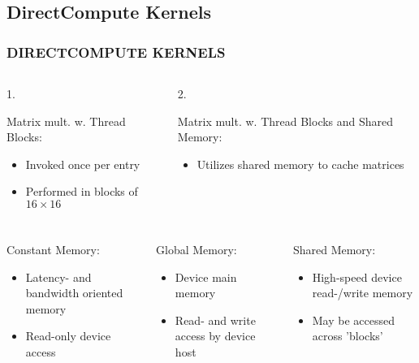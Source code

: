 \subsection{DirectCompute Kernels}
\begin{frame}[t]
\frametitle{DIRECTCOMPUTE KERNELS}

\begin{columns}[T]
  \begin{column}[T]{0.5\textwidth}
    \begin{center}1.\end{center}
    Matrix mult. w. Thread Blocks:
    \begin{itemize}
    \item Invoked once per entry
    \item Performed in blocks of $16\times 16$
    \end{itemize}
  \end{column}
  \begin{column}[T]{0.5\textwidth}
    \begin{center}2.\end{center}
    Matrix mult. w. Thread Blocks and Shared Memory:
    \begin{itemize}
    \item Utilizes shared memory to cache matrices
    \end{itemize}
  \end{column}
\end{columns}

{\footnotesize\it%
  \begin{block}{}
    \begin{columns}[T]
      \begin{column}[T]{0.33\textwidth}
        Constant Memory:
        \begin{itemize}
        \item Latency- and bandwidth oriented memory
        \item Read-only device access
        \end{itemize}
      \end{column}
      \begin{column}[T]{0.33\textwidth}
        Global Memory:
        \begin{itemize}
        \item Device main memory
        \item Read- and write access by device host
        \end{itemize}
      \end{column}
      \begin{column}[T]{0.33\textwidth}
        Shared Memory:
        \begin{itemize}
        \item High-speed device read-/write memory
        \item May be accessed across 'blocks'
        \end{itemize}
      \end{column}
    \end{columns}
  \end{block}
}

\end{frame}

